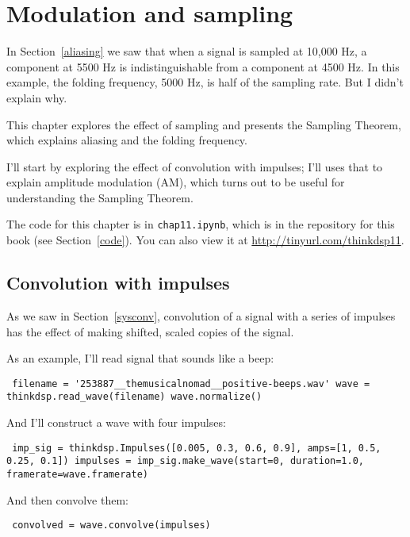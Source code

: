 \documentclass[12pt]{book} \usepackage[width=5.5in,height=8.5in, hmarginratio=3:2,vmarginratio=1:1]{geometry}
\begin{document}
\chapter{Modulation and sampling} 

In Section~\ref{aliasing} we saw that when a signal is sampled at 10,000 Hz, a component at 5500 Hz is indistinguishable from a component at 4500 Hz. In this example, the folding frequency, 5000 Hz, is half of the sampling rate. But I didn't explain why. 

This chapter explores the effect of sampling and presents the Sampling Theorem, which explains aliasing and the folding frequency. 

I'll start by exploring the effect of convolution with impulses; I'll uses that to explain amplitude modulation (AM), which turns out to be useful for understanding the Sampling Theorem. 

The code for this chapter is in {\tt chap11.ipynb}, which is in the repository for this book (see Section~\ref{code}). You can also view it at \url{http://tinyurl.com/thinkdsp11}. 

\section{Convolution with impulses} 

As we saw in Section~\ref{sysconv}, convolution of a signal with a series of impulses has the effect of making shifted, scaled copies of the signal. 

As an example, I'll read signal that sounds like a beep: 

\begin{verbatim} filename = '253887__themusicalnomad__positive-beeps.wav' wave = thinkdsp.read_wave(filename) wave.normalize() \end{verbatim} 

And I'll construct a wave with four impulses: 

\begin{verbatim} imp_sig = thinkdsp.Impulses([0.005, 0.3, 0.6, 0.9], amps=[1, 0.5, 0.25, 0.1]) impulses = imp_sig.make_wave(start=0, duration=1.0, framerate=wave.framerate) \end{verbatim} 

And then convolve them: 

\begin{verbatim} convolved = wave.convolve(impulses) \end{verbatim} 
\end{document}
